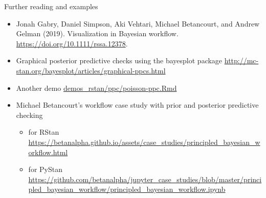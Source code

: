 \documentclass[t]{beamer}
\begin{document}
\begin{frame}

  {\Large\color{navyblue} Further reading and examples}

  \begin{itemize}
  \item Jonah Gabry, Daniel Simpson, Aki Vehtari, Michael
    Betancourt, and Andrew Gelman (2019). Visualization in Bayesian
    workflow. \url{https://doi.org/10.1111/rssa.12378}.
  \item Graphical posterior predictive checks using the bayesplot package
    \url{http://mc-stan.org/bayesplot/articles/graphical-ppcs.html}
  \item Another demo \href{http://avehtari.github.io/BDA_R_demos/demos_rstan/ppc/poisson-ppc.html}{demos\_rstan/ppc/poisson-ppc.Rmd}
  \item Michael Betancourt's workflow case study with prior and posterior predictive checking
    \begin{itemize}
    \item for RStan \url{https://betanalpha.github.io/assets/case_studies/principled_bayesian_workflow.html}
    \item for PyStan \url{https://github.com/betanalpha/jupyter_case_studies/blob/master/principled_bayesian_workflow/principled_bayesian_workflow.ipynb}
    \end{itemize}
  \end{itemize}
  
\end{frame}
\end{document}
